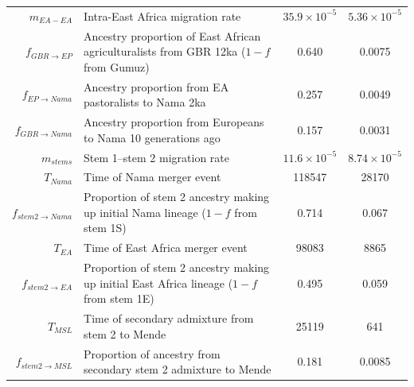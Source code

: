 \documentclass[]{article}
\begin{document}
\begin{table}[ht]
\begin{tabular}[t]{rP{8cm}cc}
    $m_{EA-EA}$ & Intra-East Africa migration rate & $35.9\times10^{-5}$ & $5.36\times10^{-5}$ \\
    $f_{GBR \rightarrow EP}$ & Ancestry proportion of East African agriculturalists from GBR 12ka ($1-f$ from Gumuz) & 0.640 & 0.0075 \\
    $f_{EP \rightarrow Nama}$ & Ancestry proportion from EA pastoralists to Nama 2ka & 0.257 & 0.0049 \\
    $f_{GBR \rightarrow Nama}$ & Ancestry proportion from Europeans to Nama 10 generations ago & 0.157 & 0.0031 \\
    $m_{stems}$ & Stem 1--stem 2 migration rate & $11.6\times10^{-5}$ & $8.74\times10^{-5}$ \\
    $T_{Nama}$ & Time of Nama merger event & 118547 & 28170 \\
    $f_{stem 2 \rightarrow Nama}$ & Proportion of stem 2 ancestry making up initial Nama lineage ($1-f$ from stem 1S) & 0.714 & 0.067 \\
    $T_{EA}$ & Time of East Africa merger event & 98083 & 8865 \\
    $f_{stem 2 \rightarrow EA}$ & Proportion of stem 2 ancestry making up initial East Africa lineage ($1-f$ from stem 1E) & 0.495 & 0.059 \\
    $T_{MSL}$ & Time of secondary admixture from stem 2 to Mende & 25119 & 641 \\
    $f_{stem 2 \rightarrow MSL}$ & Proportion of ancestry from secondary stem 2 admixture to Mende & 0.181 & 0.0085 \\
    \bottomrule
\end{tabular}
\end{table}

\newcommand{\specialcell}[2][c]{%
  \begin{tabular}[#1]{@{}c@{}}#2\end{tabular}}
\end{document}
